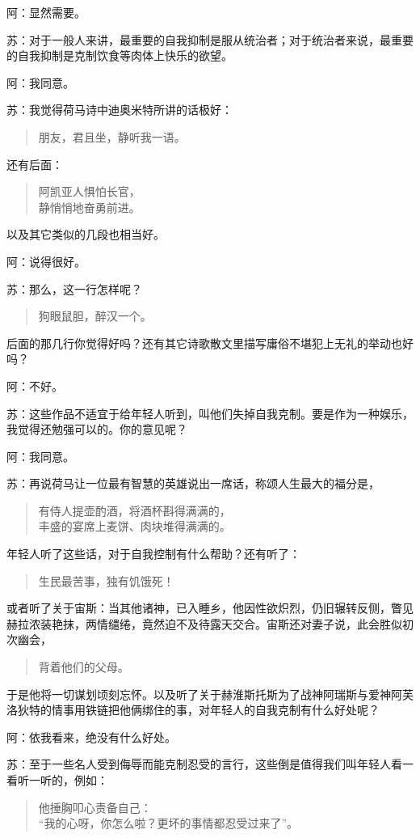 \documentclass[11pt,oneside]{book}
\begin{document}
\begin{common-format}
阿：显然需要。

苏：对于一般人来讲，最重要的自我抑制是服从统治者；对于统治者来说，最重要的自我抑制是克制饮食等肉体上快乐的欲望。

阿：我同意。

苏：我觉得荷马诗中迪奥米特所讲的话极好：
\begin{verse}
朋友，君且坐，静听我一语。
\end{verse}
还有后面：
\begin{verse}
阿凯亚人惧怕长官，\\
静悄悄地奋勇前进。
\end{verse}
以及其它类似的几段也相当好。

阿：说得很好。

苏：那么，这一行怎样呢？
\begin{verse}
狗眼鼠胆，醉汉一个。
\end{verse}
后面的那几行你觉得好吗？还有其它诗歌散文里描写庸俗不堪犯上无礼的举动也好吗？

阿：不好。

苏：这些作品不适宜于给年轻人听到，叫他们失掉自我克制。要是作为一种娱乐，我觉得还勉强可以的。你的意见呢？

阿：我同意。

苏：再说荷马让一位最有智慧的英雄说出一席话，称颂人生最大的福分是，
\begin{verse}
有侍人提壶酌酒，将酒杯斟得满满的，\\
丰盛的宴席上麦饼、肉块堆得满满的。
\end{verse}
年轻人听了这些话，对于自我控制有什么帮助？还有听了：
\begin{verse}
生民最苦事，独有饥饿死！
\end{verse}
或者听了关于宙斯：当其他诸神，已入睡乡，他因性欲炽烈，仍旧辗转反侧，瞥见赫拉浓装艳抹，两情缱绻，竟然迫不及待露天交合。宙斯还对妻子说，此会胜似初次幽会，
\begin{verse}
背着他们的父母。
\end{verse}
于是他将一切谋划顷刻忘怀。以及听了关于赫淮斯托斯为了战神阿瑞斯与爱神阿芙洛狄特的情事用铁链把他俩绑住的事，对年轻人的自我克制有什么好处呢？

阿：依我看来，绝没有什么好处。

苏：至于一些名人受到侮辱而能克制忍受的言行，这些倒是值得我们叫年轻人看一看听一听的，例如：
\begin{verse}
他捶胸叩心责备自己：\\
“我的心呀，你怎么啦？更坏的事情都忍受过来了”。
\end{verse}


\end{common-format}
\end{document}
